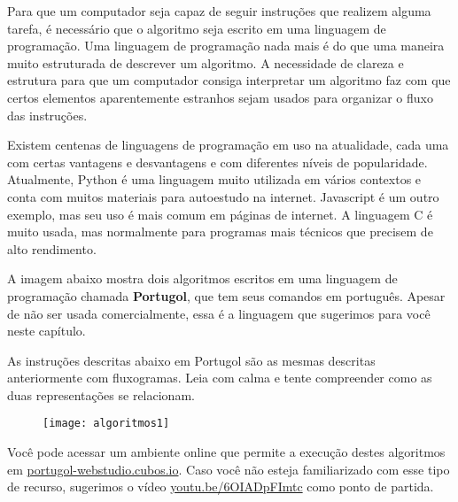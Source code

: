 Para que um computador seja capaz de seguir instruções que realizem alguma tarefa, é necessário que o algoritmo seja escrito em uma linguagem de programação. Uma linguagem de programação nada mais é do que uma maneira muito estruturada de descrever um algoritmo. A necessidade de clareza e estrutura para que um computador consiga interpretar um algoritmo faz com que certos elementos aparentemente estranhos sejam usados para organizar o fluxo das instruções.

\begin{knowledge}
Existem centenas de linguagens de programação em uso na atualidade, cada uma com certas vantagens e desvantagens e com diferentes níveis de popularidade. Atualmente, Python é uma linguagem muito utilizada em vários contextos e conta com muitos materiais para autoestudo na internet. Javascript é um outro exemplo, mas seu uso é mais comum em páginas de internet. A linguagem C é muito usada, mas normalmente para programas mais técnicos que precisem de alto rendimento.
\end{knowledge}

A imagem abaixo mostra dois algoritmos escritos em uma linguagem de programação chamada \textbf{Portugol}, que tem seus comandos em português. Apesar de não ser usada comercialmente, essa é a linguagem que sugerimos para você neste capítulo.

As instruções descritas abaixo em Portugol são as mesmas descritas anteriormente com fluxogramas. Leia com calma e tente compreender como as duas representações se relacionam.

\begin{figure}[H]
\centering

\texttt{[image: algoritmos1]}
\end{figure}

Você pode acessar um ambiente online que permite a execução destes algoritmos em \url{portugol-webstudio.cubos.io}. Caso você não esteja familiarizado com esse tipo de recurso, sugerimos o vídeo \url{youtu.be/6OIADpFImtc} como ponto de partida.


